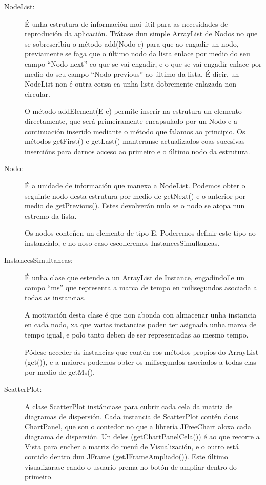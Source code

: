 \begin{description}
\item[NodeList:] \hfill
É unha estrutura de información moi útil para as necesidades de reprodución da aplicación. Trátase dun simple ArrayList de Nodos no que se sobrescribiu o método add(Nodo e) para que ao engadir un nodo, previamente se faga que o último nodo da lista enlace por medio do seu campo ``Nodo next'' co que se vai engadir, e o que se vai engadir enlace por medio do seu campo ``Nodo previous'' ao último da lista. É dicir, un NodeList non é outra cousa ca unha lista dobremente enlazada non circular.

O método addElement(E e) permite inserir na estrutura un elemento directamente, que será primeiramente encapsulado por un Nodo e a continuación inserido mediante o método que falamos ao principio. Os métodos getFirst() e getLast() manteranse actualizados coas sucesivas insercións para darnos acceso ao primeiro e o último nodo da estrutura.

\item[Nodo:] \hfill
É a unidade de información que manexa a NodeList. Podemos obter o seguinte nodo desta estrutura por medio de getNext() e o anterior por medio de getPrevious(). Estes devolverán nulo se o nodo se atopa nun estremo da lista.

Os nodos conteñen un elemento de tipo E. Poderemos definir este tipo ao instancialo, e no noso caso escolleremos InstancesSimultaneas.

\item[InstancesSimultaneas:] \hfill
É unha clase que estende a un ArrayList de Instance, engadíndolle un campo ``ms'' que representa a marca de tempo en milisegundos asociada a todas as instancias.

A motivación desta clase é que non abonda con almacenar unha instancia en cada nodo, xa que varias instancias poden ter asignada unha marca de tempo igual, e polo tanto deben de ser representadas ao mesmo tempo.

Pódese acceder ás instancias que contén cos métodos propios do ArrayList (get()), e a maiores podemos obter os milisegundos asociados a todas elas por medio de getMs().

\item[ScatterPlot:] \hfill
A clase ScatterPlot instánciase para cubrir cada cela da matriz de diagramas de dispersión. Cada instancia de ScatterPlot contén dous ChartPanel, que son o contedor no que a librería JFreeChart aloxa cada diagrama de dispersión. Un deles (getChartPanelCela()) é ao que recorre a Vista para encher a matriz do menú de Visualización, e o outro está contido dentro dun JFrame (getJFrameAmpliado()). Este último visualizarase cando o usuario prema no botón de ampliar dentro do primeiro.


\end{description}
